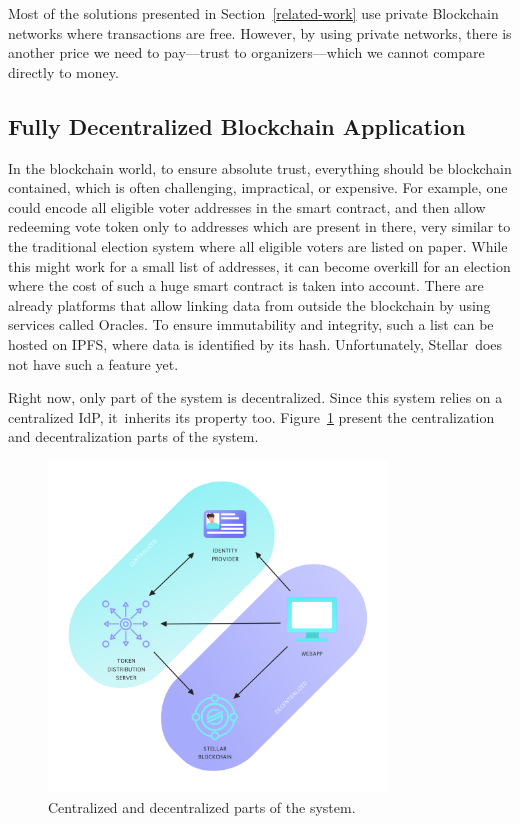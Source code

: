 \documentclass[applsci,article,accept,moreauthors,pdftex]{Definitions/mdpi}
\begin{document}
Most of the solutions presented in Section~\ref{related-work} use private Blockchain networks where transactions are free. However, by using private networks, there is another price we need to pay––trust to organizers––which we cannot compare directly to money.


\subsection{Fully Decentralized Blockchain Application}
\label{dapp}

In the blockchain world, to ensure absolute trust, everything should be blockchain contained, which is often challenging, impractical, or expensive. For example, one could encode all eligible voter addresses in the smart contract, and then allow redeeming vote token only to addresses which are present in there, very similar to the traditional election system where all eligible voters are listed on paper. While this might work for a small list of addresses, it can become overkill for an election where the cost of such a huge smart contract is taken into account. There are already platforms that allow linking data from outside the blockchain by using services called Oracles. To ensure immutability and integrity, such a list can be hosted on IPFS, where data is identified by its hash. Unfortunately, Stellar~does not have such a feature yet. 

Right now, only part of the system is decentralized. Since this system relies on a centralized IdP, it~inherits its property too. Figure~\ref{fig:decentralization} present the centralization and decentralization parts of the system.

\begin{figure}[H]
\includegraphics[width=9cm]{figs/stellot-decentralization.png}
\centering
\caption{Centralized and decentralized parts of the system.}
\label{fig:decentralization}
\end{figure}
\end{document}
